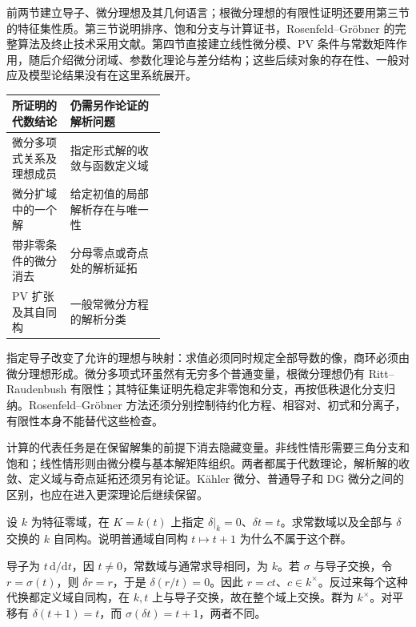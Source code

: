 \ProseParagraphBreak
前两节建立导子、微分理想及其几何语言；根微分理想的有限性证明还要用第三节的特征集性质。第三节说明排序、饱和分支与计算证书，Rosenfeld--Gröbner 的完整算法及终止技术采用文献。第四节直接建立线性微分模、PV 条件与常数矩阵作用，随后介绍微分闭域、参数化理论与差分结构；这些后续对象的存在性、一般对应及模型论结果没有在这里系统展开。
\begin{center}
	\begin{tabularx}{\linewidth}{@{}>{\raggedright\arraybackslash}p{0.38\linewidth}X@{}}
		\toprule
		所证明的代数结论 & 仍需另作论证的解析问题 \\
		\midrule
		微分多项式关系及理想成员 & 指定形式解的收敛与函数定义域 \\
		微分扩域中的一个解 & 给定初值的局部解析存在与唯一性 \\
		带非零条件的微分消去 & 分母零点或奇点处的解析延拓 \\
		PV 扩张及其自同构 & 一般常微分方程的解析分类 \\
		\bottomrule
	\end{tabularx}
\end{center}







\begin{chaptersummary}
	指定导子改变了允许的理想与映射：求值必须同时规定全部导数的像，商环必须由微分理想形成。微分多项式环虽然有无穷多个普通变量，根微分理想仍有 Ritt--Raudenbush 有限性；其特征集证明先稳定非零饱和分支，再按低秩退化分支归纳。Rosenfeld--Gröbner 方法还须分别控制待约化方程、相容对、初式和分离子，有限性本身不能替代这些检查。

	\ProseParagraphBreak
	计算的代表任务是在保留解集的前提下消去隐藏变量。非线性情形需要三角分支和饱和；线性情形则由微分模与基本解矩阵组织。两者都属于代数理论，解析解的收敛、定义域与奇点延拓还须另有论证。Kähler 微分、普通导子和 DG 微分之间的区别，也应在进入更深理论后继续保留。
\end{chaptersummary}

\BookExercises

\begin{exercise}\label{b3:ex:E-derivation-constants}
	设 \(k\) 为特征零域，在 \(K=k(t)\) 上指定 \(\delta|_k=0\)、\(\delta t=t\)。求常数域以及全部与 \(\delta\) 交换的 \(k\) 自同构。说明普通域自同构 \(t\mapsto t+1\) 为什么不属于这个群。
\end{exercise}
\begin{solution}
	导子为 \(t\,\mathrm{d}/\mathrm{d}t\)，因 \(t\ne0\)，常数域与通常求导相同，为 \(k\)。若 \(\sigma\) 与导子交换，令 \(r=\sigma(t)\)，则 \(\delta r=r\)，于是 \(\delta(r/t)=0\)。因此 \(r=ct\)、\(c\in k^\times\)。反过来每个这种代换都定义域自同构，在 \(k,t\) 上与导子交换，故在整个域上交换。群为 \(k^\times\)。对平移有 \(\delta(t+1)=t\)，而 \(\sigma(\delta t)=t+1\)，两者不同。
\end{solution}

